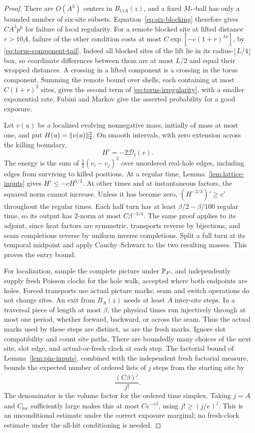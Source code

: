 \begin{proof}
There are \(O(A^3)\) centers in \(B_{11A}(z)\), and a fixed
\(M_*\)-ball has only a bounded number of six-site subsets.
Equation~\eqref{eq:six-blocking} therefore gives \(CA^3p^6\)
for failure of local regularity.  For a remote blocked site at lifted
distance \(r>10A\), failure of the other condition costs at most
\(C\exp[-c(1+r)^{\lambda\nu}]\), by
\eqref{eq:torus-component-tail}.  Indeed all blocked sites of the
lift lie in its radius-\(\lfloor L/4\rfloor\) box, so coordinate
differences between them are at most \(L/2\) and equal their wrapped
distances.  A crossing in a lifted component is a crossing in the
torus component.  Summing the remote bound over shells, each containing
at most \(C(1+r)^2\) sites, gives the second term of
\eqref{eq:torus-irregularity}, with a smaller exponential rate.
Fubini and Markov give the asserted probability for a good exposure.

Let \(v(u)\) be a localized evolving nonnegative mass, initially of
mass at most one, and put \(H(u)=\lVert v(u)\rVert_2^2\).  On smooth intervals,
with zero extension across the killing boundary,
\[
 H'=-2\mathcal D_t(v).
\]
The energy is the sum of \(\tfrac12(v_i-v_j)^2\) over unordered
real-hole edges, including edges from surviving to killed positions.
At a regular time, Lemma~\ref{lem:lattice-inputs} gives
\(H'\le-cH^{5/3}\).  At other times and at instantaneous
factors, the squared norm cannot increase.  Unless it has become zero,
\((H^{-2/3})'\ge c'\) throughout the regular times.
Each half turn has at least \(\beta/2-\beta/100\) regular time,
so its output has \(2\)-norm at most \(C\beta^{-3/4}\).
The same proof applies to its adjoint, since heat factors are
symmetric, transports reverse by bijections, and seam completions
reverse by uniform inverse completions.  Split a full turn at its
temporal midpoint and apply Cauchy--Schwarz to the two resulting
masses.  This proves the entry bound.

For localization, sample the complete picture under \(\mathbb P_P\),
and independently supply fresh Poisson clocks for the hole walk,
accepted where both endpoints are holes.  Forced transports use
actual picture marks; seam and switch operations do not change sites.
An exit from \(B_A(z)\) needs at least \(A\) inter-site steps.
In a traversal piece of length at most \(\beta\), the physical
times run injectively through at most one period, whether forward,
backward, or across the seam.  Thus the actual marks used by these
steps are distinct, as are the fresh marks.  Ignore slot compatibility
and count site paths.  There are boundedly many choices of the next
site, slot edge, and actual-or-fresh clock at each step.  The factorial
bound of Lemma~\ref{lem:pin-inputs}, combined with the independent
fresh factorial measure, bounds the expected number of ordered lists
of \(j\) steps from the starting site by
\[
 \frac{(C\beta)^j}{j!}.
\]
The denominator is the volume factor for the ordered time simplex.
Taking \(j=A\) and \(C_{\mathrm{loc}}\) sufficiently large makes
this at most \(Ce^{-c\beta}\), using \(j!\ge(j/e)^j\).
This is an unconditional estimate under the correct exposure marginal;
no fresh-clock estimate under the all-hit conditioning is needed.
\end{proof}

